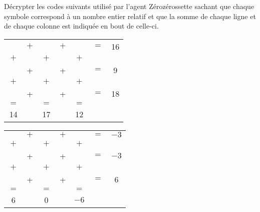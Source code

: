\Recreation

\begin{enigme}[Décryptage]
   \bigskip
   Décrypter les codes suivants utilisé par l'agent Zérozérossette sachant que chaque symbole correspond à un nombre entier relatif et que la somme de chaque ligne et de chaque colonne est indiquée en bout de celle-ci. \\
   \medskip
   \begin{center}
      {
      \begin{tabular}{*{7}{C{0.3}}}
         \Large{} & $+$ & \Large{} & $+$ & \Large{} & $=$ & \large 16 \\
         $+$ & & $+$ & & $+$ & & \\
         \Large{} & + & \Large{} & + & \Large{} & $=$ & \large 9 \\
         $+$ & & $+$ & & $+$ & & \\
         \Large{} & + & \Large{} & + & \Large{} & $=$ & \large 18 \\
         $=$ & & $=$ & & $=$ & & \\
         \large 14 & & \large 17 & & \large 12 & & \\
      \end{tabular}
      \hspace*{4cm}
      \begin{tabular}{*{7}{C{0.3}}}
         \Large{} & $+$ & \Large{} & $+$ & \Large{} & $=$ & \large $-3$ \\
         $+$ & & $+$ & & $+$ & & \\
         \Large{} & + & \Large{} & + & \Large{} & $=$ & \large $-3$ \\
         $+$ & & $+$ & & $+$ & & \\
         \Large{} & + & \Large{} & + & \Large{} & $=$ & \large 6 \\
         $=$ & & $=$ & & $=$ & & \\
         \large 6 & & \large 0 & & \large $-6$ & & \\
      \end{tabular}

      \ \\ [10mm]
      
}
\end{center}
\end{enigme}
